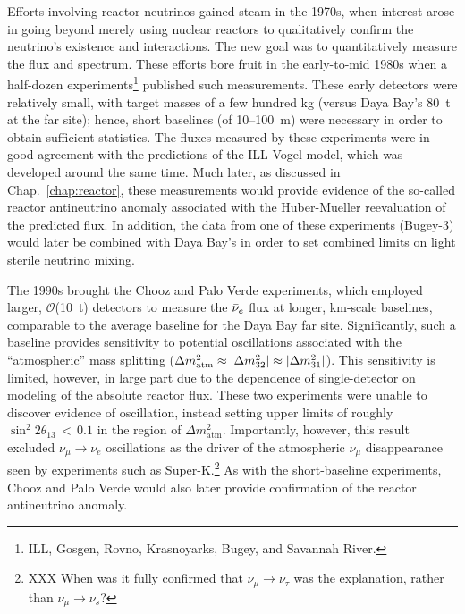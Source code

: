 \documentclass[../thesis.tex]{subfiles}
\begin{document}
Efforts involving reactor neutrinos gained steam in the 1970s, when interest
arose in going beyond merely using nuclear reactors to qualitatively confirm the
neutrino's existence and interactions. The new goal was to quantitatively
measure the flux and spectrum. These efforts bore fruit in the early-to-mid
1980s when a half-dozen experiments\footnote{ILL, Gosgen, Rovno, Krasnoyarks,
  Bugey, and Savannah River.} published such measurements. These early detectors
were relatively small, with target masses of a few hundred kg (versus Daya Bay's
80~t at the far site); hence, short baselines (of 10--100~m) were necessary in
order to obtain sufficient statistics. The fluxes measured by these experiments
were in good agreement with the predictions of the ILL-Vogel model, which was
developed around the same time. Much later, as discussed in
Chap.~\ref{chap:reactor}, these measurements would provide evidence of the
so-called reactor antineutrino anomaly associated with the Huber-Mueller
reevaluation of the predicted flux. In addition, the data from one of these
experiments (Bugey-3) would later be combined with Daya Bay's in order to set
combined limits on light sterile neutrino mixing.

The 1990s brought the Chooz and Palo Verde experiments, which employed larger,
$\mathcal{O}$(10~t) detectors to measure the $\bar\nu_e$ flux at longer, km-scale
baselines, comparable to the average baseline for the Daya Bay far
site. Significantly, such a baseline provides sensitivity to potential
oscillations associated with the ``atmospheric'' mass splitting ($\Delta
m^2_{\mathrm{atm}} \approx \lvert \Delta m^2_{32}\rvert \approx \lvert \Delta
  m^2_{31}\rvert$). This sensitivity is limited, however, in large part due to the
dependence of single-detector on modeling of the absolute reactor flux. These
two experiments were unable to discover evidence of oscillation, instead setting
upper limits of roughly $\sin^2 2\theta_{13}\,<\,0.1$ in the region of $\Delta
m^2_{\mathrm{atm}}$. Importantly, however, this result excluded $\nu_\mu
\rightarrow \nu_e$ oscillations as the driver of the atmospheric $\nu_\mu$
disappearance seen by experiments such as Super-K.\footnote{XXX When was it
  fully confirmed that $\nu_\mu \rightarrow \nu_\tau$ was the explanation,
  rather than $\nu_\mu \rightarrow \nu_s$? } As with the short-baseline
experiments, Chooz and Palo Verde would also later provide confirmation of the
reactor antineutrino anomaly.
\end{document}
